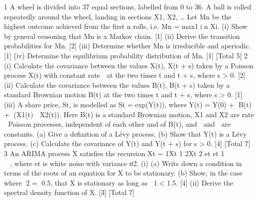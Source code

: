 
1 A wheel is divided into 37 equal sections, labelled from 0 to 36. A ball is rolled
repeatedly around the wheel, landing in sections X1, X2, … Let Mn be the highest
outcome achieved from the first n rolls, i.e. Mn = max1in Xi.
(i) Show by general reasoning that Mn is a Markov chain. [1]
(ii) Derive the transition probabilities for Mn. [2]
(iii) Determine whether Mn is irreducible and aperiodic. [1]
(iv) Determine the equilibrium probability distribution of Mn. [1]
[Total 5]
2 (i) Calculate the covariance between the values X(t), X(t + s) taken by a Poisson
process X(t) with constant rate  at the two times t and t + s, where s > 0. [2]
(ii) Calculate the covariance between the values B(t), B(t + s) taken by a standard
Brownian motion B(t) at the two times t and t + s, where s > 0. [1]
(iii) A share price, St, is modelled as St = exp(Y(t)), where
Y(t) = Y(0) + B(t) + (X1(t)  X2(t)).
Here B(t) is a standard Brownian motion, X1 and X2 are rate  Poisson
processes, independent of each other and of B(t), and  and  are constants.
(a) Give a definition of a Lévy process.
(b) Show that Y(t) is a Lévy process.
(c) Calculate the covariance of Y(t) and Y(t + s) for s > 0. [4]
[Total 7]
3 An ARIMA process X satisfies the recursion
Xt = 1Xt 1 2Xt 2 et et 1        ,
where et is white noise with variance σ2.
(i) (a) Write down a condition in terms of the roots of an equation for X to be
stationary.
(b) Show, in the case where 2 = 0.5, that X is stationary as long as
1< 1.5.
[4]
(ii) Derive the spectral density function of X. [3]
[Total 7]

